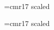 
\font\xxiptrm=cmr17  scaled


\def\xxipt{\ifmmode\err@badsizechange\else
     \@mathfontinit
     \@fontstyleinit
     \def\rm{\xxiptrm\fam=\z@}%
     \rm\fi}


\font\xxvptrm=cmr17  scaled


\def\xxvpt{\ifmmode\err@badsizechange\else
     \@mathfontinit
     \@fontstyleinit
     \def\rm{\xxvptrm\fam=\z@}%
     \rm\fi}






